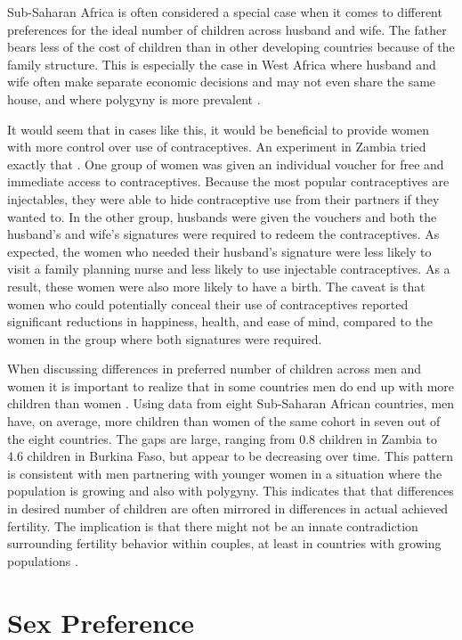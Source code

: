 \documentclass[letterpaper,12pt]{article}
\begin{document}
Sub-Saharan Africa is often considered a special case when it comes to
different preferences for the ideal number of children across husband
and wife. 
The father bears less of the cost of children than in other developing
countries because of the family structure. 
This is especially the case in West Africa where husband and wife often
make separate economic decisions and may not even share the same house,
and where polygyny is more prevalent
\citep{Caldwell1992,Udry1996,Tertilt2005}.

It would seem that in cases like this, it would be beneficial to provide
women with more control over use of contraceptives. 
An experiment in Zambia tried exactly that \citep{Ashraf2014}. 
One group of women was given an individual voucher for free and
immediate access to contraceptives. 
Because the most popular contraceptives are injectables, they were able
to hide contraceptive use from their partners if they wanted to. 
In the other group, husbands were given the vouchers and both the
husband's and wife's signatures were required to redeem the
contraceptives. 
As expected, the women who needed their husband's signature were less
likely to visit a family planning nurse and less likely to use
injectable contraceptives. 
As a result, these women were also more likely to have a birth. 
The caveat is that women who could potentially conceal their use of
contraceptives reported significant reductions in happiness, health, and
ease of mind, compared to the women in the group where both signatures
were required.

When discussing differences in preferred number of children across men
and women it is important to realize that in some countries men do end
up with more children than women \citep{Field2016}. 
Using data from eight Sub-Saharan African countries, men have, on
average, more children than women of the same cohort in seven out of the
eight countries. 
The gaps are large, ranging from 0.8 children in Zambia to 4.6 children
in Burkina Faso, but appear to be decreasing over time. 
This pattern is consistent with men partnering with younger women in a
situation where the population is growing and also with polygyny. 
This indicates that that differences in desired number of children are
often mirrored in differences in actual achieved fertility. 
The implication is that there might not be an innate contradiction
surrounding fertility behavior within couples, at least in countries
with growing populations \citep{Field2016}.

\section{Sex Preference}\label{sex-preference}
\end{document}
